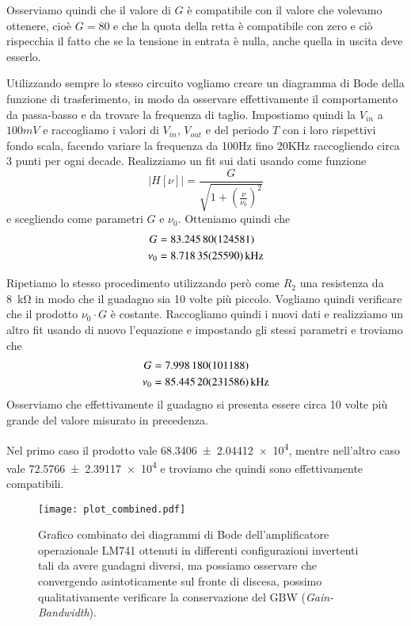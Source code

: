 \documentclass[
    rmp,
    reprint, 
    superscriptaddress, 
    altaffilletter, 
    amsmath, 
    amssymb,
    a4paper]{revtex4-2}
\begin{document}
Osserviamo quindi che il valore di $G$ è compatibile con il valore che volevamo ottenere, cioè $G=80$ e che la quota della retta è compatibile con zero e ciò rispecchia il fatto che se la tensione in entrata è nulla, anche quella in uscita deve esserlo.

Utilizzando sempre lo stesso circuito vogliamo creare un diagramma di Bode della funzione di trasferimento, in modo da osservare effettivamente il comportamento da passa-basso e da trovare la frequenza di taglio. Impostiamo quindi la $V_{in}$ a $100mV$ e raccogliamo i valori di $V_{in}$, $V_{out}$ e del periodo $T$ con i loro rispettivi fondo scala, facendo variare la frequenza da 100Hz fino 20KHz raccogliendo circa 3 punti per ogni decade. Realizziamo un fit sui dati usando come funzione  \begin{equation}\left|H[\nu]\right|=\frac{G}{\sqrt{1+\left(\frac{\nu}{\nu_0}\right)^2}} \label{eq:H}\end{equation} e scegliendo come parametri $G$ e $\nu_0$. 
Otteniamo quindi che
\begin{align*}
    G     &=\num{ 83.2458 +- 1.24581} \\
    \nu_0 &=\SI{8.71835 +- 0.2559}{\kilo\hertz} \\ 
\end{align*}

Ripetiamo lo stesso procedimento utilizzando però come $R_2$ una resistenza da \SI{8}{\kilo\ohm} in modo che il guadagno sia 10 volte più piccolo. Vogliamo quindi verificare che il prodotto $\nu_0 \cdot G $ è costante. Raccogliamo quindi i nuovi dati e realizziamo un altro fit usando di nuovo l'equazione  e impostando gli stessi parametri e troviamo che
\begin{align*}
    G     &=\num{7.99818 +- 0.101188} \\
    \nu_0 &=\SI{85.4452 +- 2.31586}{\kilo\hertz} \\ 
\end{align*}
Osserviamo che effettivamente il guadagno si presenta essere circa 10 volte più grande del valore misurato in precedenza.

Nel primo caso il prodotto vale \num{68.3406 +- 2.04412e4}, mentre nell'altro caso vale \num{72.5766 +- 2.39117e4} e troviamo che quindi sono effettivamente compatibili.

\begin{figure}
    \texttt{[image: plot\_combined.pdf]}
    \caption{Grafico combinato dei diagrammi di Bode dell'amplificatore operazionale LM741 ottenuti in differenti configurazioni invertenti tali da avere guadagni diversi, ma possiamo osservare che convergendo asintoticamente sul fronte di discesa, possimo qualitativamente verificare la conservazione del GBW (\emph{Gain-Bandwidth}).}
    \label{fig:plot_combined}
\end{figure}
\end{document}
